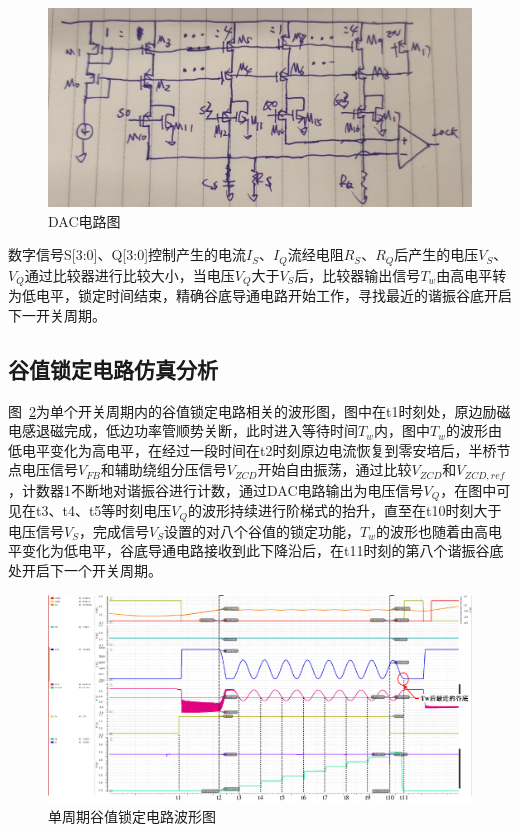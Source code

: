 \begin{figure}[htbp] 
    \centering
    \includegraphics[width=0.6\linewidth]{figures/DAC电路.jpg}
    \caption{DAC电路图}
    \label{fig:DAC电路}
\end{figure} 

数字信号S[3:0]、Q[3:0]控制产生的电流$I_S$、$I_Q$流经电阻$R_S$、$R_Q$后产生的电压$V_S$、$V_Q$通过比较器进行比较大小，当电压$V_Q$大于$V_S$后，比较器输出信号$T_w$由高电平转为低电平，锁定时间结束，精确谷底导通电路开始工作，寻找最近的谐振谷底开启下一开关周期。

\subsection{谷值锁定电路仿真分析}

图~\ref{fig:单周期谷值锁定电路波形图}为单个开关周期内的谷值锁定电路相关的波形图，图中在t1时刻处，原边励磁电感退磁完成，低边功率管顺势关断，此时进入等待时间$T_w$内，图中$T_w$的波形由低电平变化为高电平，在经过一段时间在t2时刻原边电流恢复到零安培后，半桥节点电压信号$V_{FB}$和辅助绕组分压信号$V_{ZCD}$开始自由振荡，通过比较$V_{ZCD}$和$V_{ZCD,ref}$，计数器1不断地对谐振谷进行计数，通过DAC电路输出为电压信号$V_{Q}$，在图中可见在t3、t4、t5等时刻电压$V_{Q}$的波形持续进行阶梯式的抬升，直至在t10时刻大于电压信号$V_{S}$，完成信号$V_{S}$设置的对八个谷值的锁定功能，$T_w$的波形也随着由高电平变化为低电平，谷底导通电路接收到此下降沿后，在t11时刻的第八个谐振谷底处开启下一个开关周期。

\begin{figure}[htbp] 
    \centering
    \includegraphics[width=0.8\linewidth]{figures/valley_lock.pdf}
    \caption{单周期谷值锁定电路波形图}
    \label{fig:单周期谷值锁定电路波形图}
\end{figure} 

